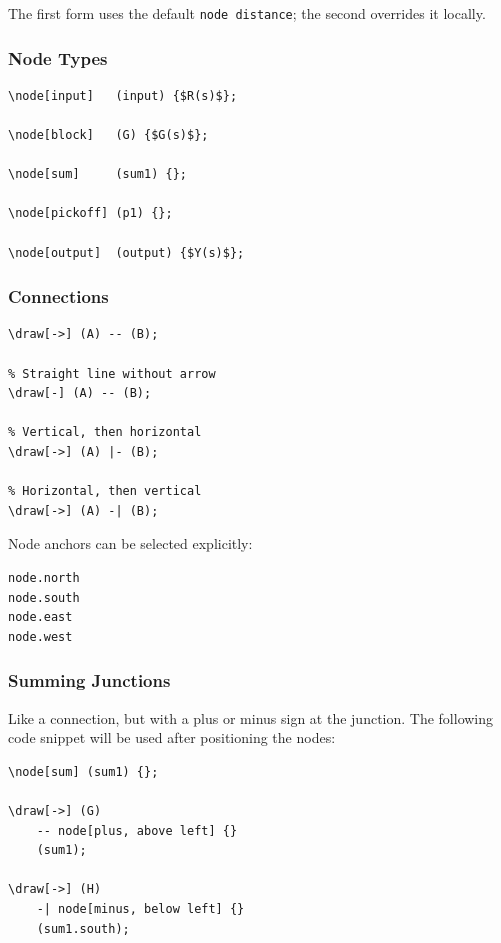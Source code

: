The first form uses the default \texttt{node distance}; the second
overrides it locally.


\subsubsection{Node Types}

\begin{lstlisting}[style=latex]
\node[input]   (input) {$R(s)$};

\node[block]   (G) {$G(s)$};

\node[sum]     (sum1) {};

\node[pickoff] (p1) {};

\node[output]  (output) {$Y(s)$};
\end{lstlisting}


\subsubsection{Connections}

\begin{lstlisting}[style=latex]
% Straight line
\draw[->] (A) -- (B);

% Straight line without arrow
\draw[-] (A) -- (B);

% Vertical, then horizontal
\draw[->] (A) |- (B);

% Horizontal, then vertical
\draw[->] (A) -| (B);
\end{lstlisting}

Node anchors can be selected explicitly:

\begin{lstlisting}[style=latex]
node.north
node.south
node.east
node.west
\end{lstlisting}


\subsubsection{Summing Junctions}
Like a connection, but with a plus or minus sign at the junction.
The following code snippet will be used after positioning the nodes:
\begin{lstlisting}[style=latex]
\node[sum] (sum1) {};

\draw[->] (G)
    -- node[plus, above left] {}
    (sum1);

\draw[->] (H)
    -| node[minus, below left] {}
    (sum1.south);
\end{lstlisting}

